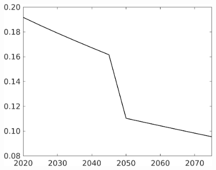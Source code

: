 \documentclass[12pt]{article}
\begin{document}
\begin{figure}[h!!]
\begin{minipage}[]{0.32\textwidth}
	\end{minipage}		
	\begin{minipage}[]{0.32\textwidth}
		\includegraphics[width=1\textwidth]{../../codding_model/own_basedOnFried/optimalPol_010922_revision/figures/all_13Sept22/CompTaufPER_bytaul_Reg0_EY_spillover0_nsk0_xgr1_knspil0_sep1_LFlimit1_emsbase0_countec0_GovRev0_etaa0.79_lgd0.png}
	\end{minipage}	
\end{figure}
\end{document}

